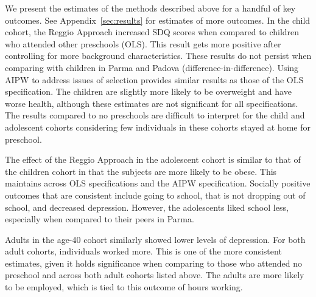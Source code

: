 We present the estimates of the methods described above for a handful of key outcomes. See Appendix~\ref{sec:results} for estimates of more outcomes. In the child cohort, the Reggio Approach increased SDQ scores when compared to children who attended other preschools (OLS). This result gets more positive after controlling for more background characteristics. These results do not persist when comparing with children in Parma and Padova (difference-in-difference). Using AIPW to address issues of selection provides similar results as those of the OLS specification. The children are slightly more likely to be overweight and have worse health, although these estimates are not significant for all specifications. The results compared to no preschools are difficult to interpret for the child and adolescent cohorts considering few individuals in these cohorts stayed at home for preschool.

The effect of the Reggio Approach in the adolescent cohort is similar to that of the children cohort in that the subjects are more likely to be obese. This maintains across OLS specifications and the AIPW specification. Socially positive outcomes that are consistent include going to school, that is not dropping out of school, and decreased depression. However, the adolescents liked school less, especially when compared to their peers in Parma.

Adults in the age-40 cohort similarly showed lower levels of depression. For both adult cohorts, individuals worked more. This is one of the more consistent estimates, given it holds significance when comparing to those who attended no preschool and across both adult cohorts listed above. The adults are more likely to be employed, which is tied to this outcome of hours working. 


